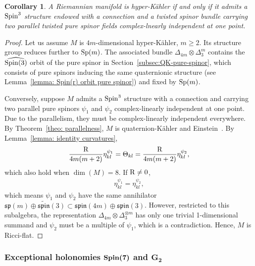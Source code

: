 \documentclass[10pt,a4paper]{amsart}
\numberwithin{equation}{section}
\newtheorem{Corollary}[Theorem]{Corollary}
\begin{document}
\begin{Corollary} A Riemannian manifold is hyper-K\"ahler if and only if it admits a ${\rm Spin}^3$ structure endowed with a connection and a twisted spinor bundle carrying two parallel twisted pure spinor fields complex-lnearly independent at one point.
\end{Corollary}
\begin{proof} Let us assume $M$ is $4m$-dimensional hyper-K\"ahler, $m\geq 2$. Its structure group reduces further to ${\rm Sp}(m)$. The associated bundle $\Delta_{4m}\otimes \Delta_3^{m}$ contains the $\widehat{{\rm Spin}(3)}$ orbit of the pure spinor in Section~\ref{subsec:QK-pure-spinor}, which consists of pure spinors inducing the same quaternionic structure (see Lemma~\ref{lemma: Spin(r) orbit pure spinor}) and fixed by ${\rm Sp}(m)$.

Conversely, suppose $M$ admits a ${\rm Spin}^3$ structure with a connection and carrying two parallel pure spinors $\psi_1$ and $\psi_2$ complex-linearly independent at one point. Due to the parallelism, they must be complex-linearly independent everywhere. By Theorem~\ref{theo: parallelness}, $M$ is quaternion-K\"ahler and Einstein~\cite{Berger}. By Lemma~\ref{lemma: identity curvatures},
\begin{gather*}{{\rm R}\over 4m (m+2)}\eta^{\psi_1}_{kl}=\Theta_{kl}={{\rm R}\over 4m (m+2)}\eta^{\psi_2}_{kl},\end{gather*}
which also hold when $\dim(M)=8$.
If ${\rm R}\not=0$,
\begin{gather*}\eta^{\psi_1}_{kl}=\eta^{\psi_2}_{kl},\end{gather*}
which means $\psi_1$ and $\psi_2$ have the same annihilator $\mathfrak{sp}(m)\oplus \widetilde{\mathfrak{spin}}(3)\subset\mathfrak{spin}(4m)\oplus \mathfrak{spin}(3)$.
However, restricted to this subalgebra, the representation $\Delta_{4m}\otimes \Delta_3^{\otimes m}$ has only one trivial 1-dimensional summand and
$\psi_2$ must be a multiple of $\psi_1$, which is a contradiction. Hence, $M$ is Ricci-flat.
\end{proof}

\subsubsection[Exceptional holonomies ${\rm Spin}(7)$ and $G_2$]{Exceptional holonomies $\boldsymbol{{\rm Spin}(7)}$ and $\boldsymbol{G_2}$}
\end{document}
